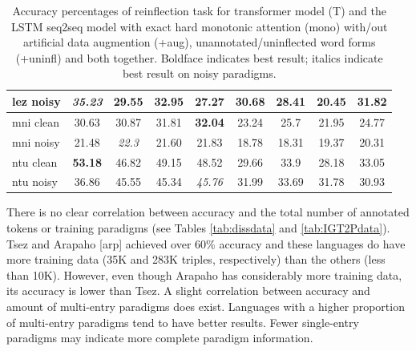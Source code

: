 \begin{table}[!tb]
\begin{tabular}{l|cccc|cccc}
      lez noisy & \textit{35.23} & 29.55 & 32.95 & 27.27          & 30.68 & 28.41 & 20.45 & 31.82 \\
      \hline
      mni clean & 30.63 & 30.87         & 31.81 & \textbf{32.04} & 23.24 & 25.7 & 21.95 & 24.77 \\
      mni noisy & 21.48 & \textit{22.3} & 21.60 & 21.83          & 18.78 & 18.31 & 19.37 & 20.31 \\
      \hline
      ntu clean & \textbf{53.18} & 46.82 & 49.15 & 48.52          & 29.66 & 33.9 & 28.18 & 33.05 \\
      ntu noisy & 36.86          & 45.55 & 45.34 & \textit{45.76} & 31.99 & 33.69 & 31.78 & 30.93 \\
    \end{tabular}
    \caption[IGT2P Results]{Accuracy percentages of reinflection task for transformer model (T) and the LSTM seq2seq model with exact hard monotonic attention (mono) with/out artificial data augmention (+aug), unannotated/uninflected word forms (+uninfl) and both together. Boldface indicates best result; italics indicate best result on noisy paradigms.}
    \label{tab:IGT2Presults}
\end{table}

There is no clear correlation between accuracy and the total number of annotated tokens or training paradigms (see Tables \ref{tab:dissdata} and \ref{tab:IGT2Pdata}). Tsez and Arapaho [arp] achieved over 60\% accuracy and these languages do have more training data (35K and 283K triples, respectively) than the others (less than 10K). However, even though Arapaho has considerably more training data, its accuracy is lower than Tsez. A slight correlation between accuracy and amount of multi-entry paradigms does exist. Languages with a higher proportion of multi-entry paradigms tend to have better results. Fewer single-entry paradigms may indicate more complete paradigm information.

